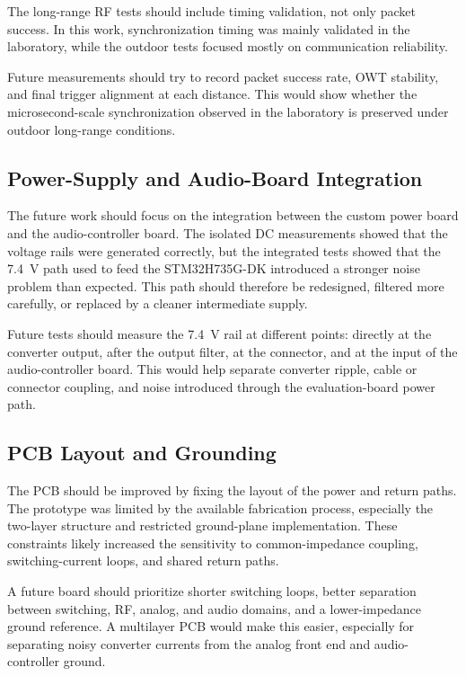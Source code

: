 The long-range RF tests should  include timing validation, not only packet success. In this work, synchronization timing was mainly validated in the laboratory, while the outdoor tests focused mostly on communication reliability.

Future measurements should try to record packet success rate, OWT stability, and final trigger alignment at each distance. This would show whether the microsecond-scale synchronization observed in the laboratory is preserved under outdoor long-range conditions.

\subsection{Power-Supply and Audio-Board Integration}

The future work should focus on the integration between the custom power board and the audio-controller board. The isolated DC measurements showed that the voltage rails were generated correctly, but the integrated tests showed that the 7.4~V path used to feed the STM32H735G-DK introduced a stronger noise problem than expected. This path should therefore be redesigned, filtered more carefully, or replaced by a cleaner intermediate supply.

Future tests should measure the 7.4~V rail at different points: directly at the converter output, after the output filter, at the connector, and at the input of the audio-controller board. This would help separate converter ripple, cable or connector coupling, and noise introduced through the evaluation-board power path.

\subsection{PCB Layout and Grounding}

The PCB should be improved by fixing the layout of the power and return paths. The prototype was limited by the available fabrication process, especially the two-layer structure and restricted ground-plane implementation. These constraints likely increased the sensitivity to common-impedance coupling, switching-current loops, and shared return paths.

A future board should prioritize shorter switching loops, better separation between switching, RF, analog, and audio domains, and a lower-impedance ground reference. A multilayer PCB would make this easier, especially for separating noisy converter currents from the analog front end and audio-controller ground.

